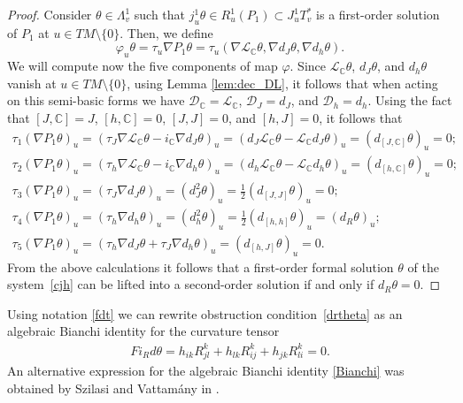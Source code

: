 \documentclass[pdftex]{sigma}
\numberwithin{equation}{section}
\begin{document}
\begin{proof}
Consider $\theta\in \Lambda^1_v$ such that $j^1_u\theta\in
R^1_u(P_1)\subset J_u^1T^*_v$ is a f\/irst-order solution of $P_1$
at $u\in TM\setminus\{0\}$. Then, we def\/ine
\[
 \varphi_u\theta=\tau_u\nabla P_1\theta=\tau_u(\nabla \mathcal{L}_{\mathbb{C}}\theta,
\nabla d_J\theta, \nabla d_h\theta).
\] We will compute now the
f\/ive components of map $\varphi$. Since
$\mathcal{L}_{\mathbb{C}}\theta$, $d_J\theta$, and $d_h\theta$
vanish at $u\in TM\setminus\{0\}$, using Lemma \ref{lem:dec_DL},
it follows that when acting on this semi-basic forms we have
$\mathcal{D}_{\mathbb{C}}=\mathcal{L}_{\mathbb{C}}$,
$\mathcal{D}_{J}=d_J$, and $\mathcal{D}_{h}=d_h$. Using the fact that
$[J, \mathbb{C}]=J$, $[h, \mathbb{C}]=0$,  $[J, J]=0$, and $[h,J]=0$,
it follows that
\begin{gather*}
\tau_{1}\left(\nabla P_1\theta\right)_u  =  \left(\tau_J\nabla
\mathcal{L}_{\mathbb{C}} \theta - i_{\mathbb{C}}\nabla
d_J\theta\right)_u= \left(d_J\mathcal{L}_{\mathbb{C}} \theta -
\mathcal{L}_{\mathbb{C}} d_J\theta\right)_u =
(d_{[J,\mathbb{C}]}\theta)_u=0; \\
\tau_{2}\left(\nabla P_1\theta\right)_u  =  \left(\tau_h\nabla
\mathcal{L}_{\mathbb{C}} \theta - i_{\mathbb{C}}\nabla
d_h\theta\right)_u= \left(d_h\mathcal{L}_{\mathbb{C}} \theta -
\mathcal{L}_{\mathbb{C}} d_h\theta\right)_u =
(d_{[h,\mathbb{C}]}\theta)_u=0; \\
\tau_{3}\left(\nabla P_1\theta\right)_u  =  \left(\tau_J\nabla
d_J\theta\right)_u= \left(d^2_J\theta\right)_u
=\frac{1}{2}(d_{[J,J]}\theta)_u=0; \\
\tau_{4}\left(\nabla P_1\theta\right)_u  =  \left(\tau_h\nabla
d_h\theta\right)_u= \left(d^2_h\theta\right)_u
=\frac{1}{2}(d_{[h,h]}\theta)_u=(d_{R}\theta)_u; \\
\tau_{5}\left(\nabla P_1\theta\right)_u  =  \left(\tau_h\nabla
d_J\theta + \tau_J\nabla d_h\theta\right)_u=
(d_{[h,J]}\theta)_u=0.
\end{gather*}
From the above calculations it follows that a f\/irst-order formal
solution $\theta$ of the system~\eqref{cjh} can be lifted into a
second-order solution if and only if $d_R\theta=0$.
\end{proof}

Using notation \eqref{fdt} we can rewrite obstruction condition~\eqref{drtheta} as an algebraic Bianchi identity for the curvature
tensor
\begin{gather}
Fi_Rd\theta=h_{ik}R^k_{jl}+ h_{lk}R^k_{ij}+h_{jk}R^k_{li}=0. \label{Bianchi}
\end{gather}
An alternative expression for the algebraic Bianchi identity
\eqref{Bianchi} was obtained by Szilasi and Vattam\'any in
\cite[4.9.1a]{szilasi02}.
\end{document}
